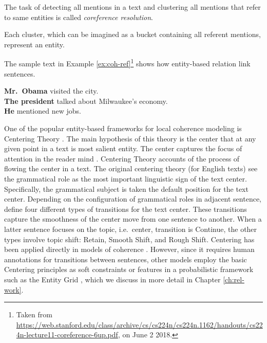 \begin{definition}
	The task of detecting all mentions in a text and clustering all mentions that refer to same entities is called \emph{coreference resolution}. 
\end{definition}

Each cluster, which can be imagined as a bucket containing all referent mentions, represent an entity. 

The sample text in Example \ref{ex:coh-ref}\footnote{Taken from \url{https://web.stanford.edu/class/archive/cs/cs224n/cs224n.1162/handouts/cs224n-lecture11-coreference-6up.pdf}, on June 2 2018.} shows how entity-based relation link sentences. 

\begin{examples}
	\label{ex:coh-ref}
	\textbf{Mr.\ Obama} visited the city. \\
	\textbf{The president} talked about Milwaukee’s economy. \\
	\textbf{He} mentioned new jobs. \\
\end{examples} 

One of the popular entity-based frameworks for local coherence modeling is Centering Theory \cite{grosz95}. 
The main hypothesis of this theory is the center that at any given point in a text is most salient entity.  
The center captures the focus of attention in the reader mind \cite{grosz95}.
Centering Theory accounts of the process of flowing the center in a text. 
The original centering theory (for English texts) see the grammatical role as the most important linguistic sign of the text center. 
Specifically, the grammatical subject is taken the default position for the text center. 
Depending on the configuration of grammatical roles in adjacent sentence,  define four different types of transitions for the text center. 
These transitions capture the smoothness of the center move from one sentence to another. 
When a latter sentence focuses on the topic, i.e.\ center, transition is Continue, the other types involve topic shift: Retain, Smooth Shift, and Rough Shift. 
Centering has been applied directly in models of coherence \cite{karamanis04a}.  
However, since it requires human annotations for transitions between sentences, other models employ the basic Centering principles as soft constraints or features in a probabilistic framework such as the Entity Grid , which we discuss in more detail in Chapter \ref{ch:rel-work}.

